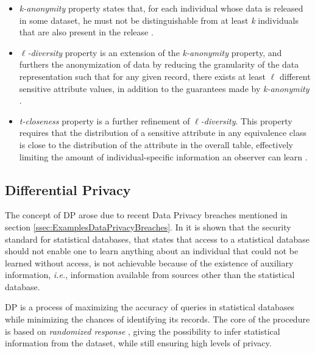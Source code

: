 \begin{itemize}
    \setlength\itemsep{1em}
    \item \textit{k-anonymity} property states that, for each individual whose data is released in some dataset, he must not be distinguishable from at least \textit{k} individuals that are also present in the release \cite{sweeney2002k}. 

    \item $\ell$\textit{-diversity} property is an extension of the \textit{k-anonymity} property, and furthers the anonymization of data by reducing the granularity of the data representation such that for any given record, there exists at least $\ell$ different sensitive attribute values, in addition to the guarantees made by \textit{k-anonymity} \cite{machanavajjhala2007diversity}.

    \item \textit{t-closeness} property is a further refinement of $\ell$\textit{-diversity}. This property requires that the distribution of a sensitive attribute in any equivalence class is close to the distribution of the attribute in the overall table, effectively limiting the amount of individual-specific information an observer can learn \cite{li2007t}.  
\end{itemize} 


\subsection{Differential Privacy}
\label{ssec:DifferentialPrivacy}


The concept of \acf{DP} arose due to recent Data Privacy breaches mentioned in section \ref{ssec:ExamplesDataPrivacyBreaches}. In \cite{Dwork2006} it is shown that the security standard for statistical databases, that states that access to a statistical database should not enable one to learn anything about an individual that could not be learned without access, is not achievable because of the existence of auxiliary information, \textit{i.e.}, information available from sources other than the statistical database.

\ac{DP} is a process of maximizing the accuracy of queries in statistical databases while minimizing the chances of identifying its records. The core of the procedure is based on \textit{randomized response} \cite{warner1965randomized}, giving the possibility to infer statistical information from the dataset, while still ensuring high levels of privacy.

